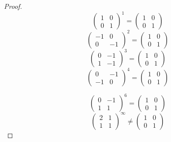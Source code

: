 \begin{proof}
    $$ \left(\begin{array}{cc}
        {1} & {0} \\ 
        {0} & {1} \end{array}\right)^1= \left(\begin{array}{ll}
            {1} & {0} \\ 
            {0} & {1} \end{array}\right)$$
    $$ \left(\begin{array}{cc}
        {-1} & {0} \\ 
        {0} & {-1} \end{array}\right)^2= \left(\begin{array}{ll}
            {1} & {0} \\ 
            {0} & {1} \end{array}\right)$$
    $$ \left(\begin{array}{cc}
        {0} & {-1} \\ 
        {1} & {-1} \end{array}\right)^3= \left(\begin{array}{ll}
            {1} & {0} \\ 
            {0} & {1} \end{array}\right)$$
    $$ \left(\begin{array}{cc}
        {0} & {-1} \\ 
        {-1} & {0} \end{array}\right)^4= \left(\begin{array}{ll}
            {1} & {0} \\ 
            {0} & {1} \end{array}\right)$$
    
    $$ \left(\begin{array}{cc}
        {0} & {-1} \\ 
        {1} & {1} \end{array}\right)^6= \left(\begin{array}{ll}
            {1} & {0} \\ 
            {0} & {1} \end{array}\right)$$
    $$ \left(\begin{array}{cc}
        {2} & {1} \\ 
        {1} & {1} \end{array}\right)^\infty\neq \left(\begin{array}{ll}
            {1} & {0} \\ 
            {0} & {1} \end{array}\right)$$
\end{proof}
